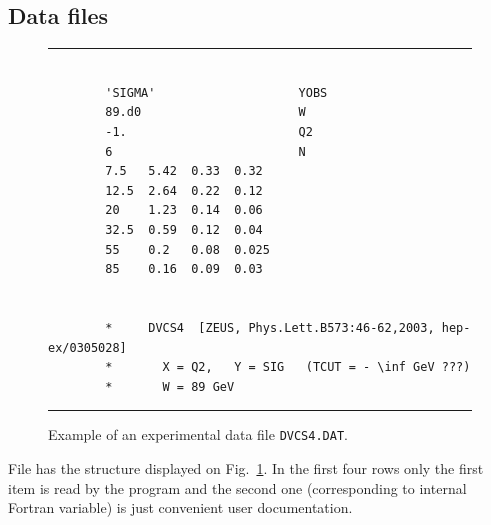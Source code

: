 \documentclass[12pt]{article}
\begin{document}
\subsection{Data files}

\begin{figure}[t]
\begin{center}
\hrule
\begin{verbatim}

        'SIGMA'                    YOBS
        89.d0                      W
        -1.                        Q2
        6                          N
        7.5   5.42  0.33  0.32 
        12.5  2.64  0.22  0.12 
        20    1.23  0.14  0.06 
        32.5  0.59  0.12  0.04 
        55    0.2   0.08  0.025 
        85    0.16  0.09  0.03


        *     DVCS4  [ZEUS, Phys.Lett.B573:46-62,2003, hep-ex/0305028]
        *       X = Q2,   Y = SIG   (TCUT = - \inf GeV ???)
        *       W = 89 GeV

\end{verbatim}
\hrule
\end{center}
\caption{Example of an experimental data file \texttt{DVCS4.DAT}.}
\label{fig:DVCS4.DAT}
\end{figure}

File has the structure displayed on Fig.~\ref{fig:DVCS4.DAT}. In the first
four rows only the first item is read by the program and the second one
(corresponding to internal Fortran variable) is just convenient user
documentation.
\end{document}
